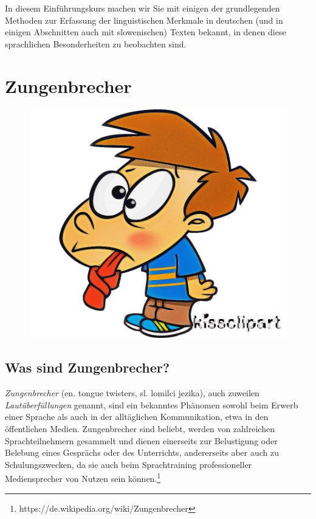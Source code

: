 \documentclass[
  letterpaper,
]{scrbook}
\begin{document}
In diesem Einführungskurs machen wir Sie mit einigen der grundlegenden
Methoden zur Erfassung der linguistischen Merkmale in deutschen (und in
einigen Abschnitten auch mit slowenischen) Texten bekannt, in denen
diese sprachlichen Besonderheiten zu beobachten sind.

\hypertarget{sec-zungenbrecher}{%
\chapter{Zungenbrecher}\label{sec-zungenbrecher}}

\begin{figure}

{\centering 

\href{https://www.kissclipart.com/tongue-twister-cartoon-comics-stop-consonant-m2n92r/}{\includegraphics[width=1\textwidth,height=\textheight]{./pictures/kissclipart-tongue-twister-cartoon-comics-stop-consonant-82fba1d0b8543744.png}}

}

\end{figure}

\hypertarget{was-sind-zungenbrecher}{%
\section{Was sind Zungenbrecher?}\label{was-sind-zungenbrecher}}

\emph{Zungenbrecher} (en. tongue twisters, sl. lomilci jezika), auch
zuweilen \emph{Lautüberfüllungen} genannt, sind ein bekanntes Phänomen
sowohl beim Erwerb einer Sprache als auch in der alltäglichen
Kommunikation, etwa in den öffentlichen Medien. Zungenbrecher sind
beliebt, werden von zahlreichen Sprachteilnehmern gesammelt und dienen
einerseits zur Belustigung oder Belebung eines Gesprächs oder des
Unterrichts, andererseits aber auch zu Schulungszwecken, da sie auch
beim Sprachtraining professioneller Mediensprecher von Nutzen sein
können.\footnote{https://de.wikipedia.org/wiki/Zungenbrecher}
\end{document}
